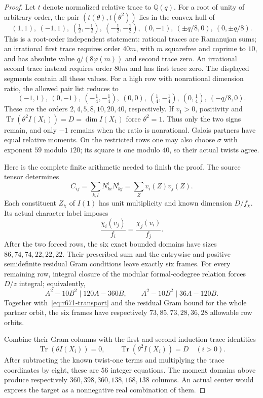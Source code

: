 \begin{proof}
Let $t$ denote normalized relative trace to $\mathbb Q(q)$.
For a root of unity of arbitrary order, the pair
$(t(\theta),t(\theta^2))$ lies in the convex hull of
\[
 (1,1),\ (-1,1),\ (\tfrac12,-\tfrac12),\
 (-\tfrac12,-\tfrac12),\ (0,-1),\
 (\pm q/8,0),\ (0,\pm q/8).
\]
This is a root-order independent statement: rational traces are
Ramanujan sums; an irrational first trace requires order $40m$, with
$m$ squarefree and coprime to $10$, and has absolute value
$q/(8\varphi(m))$ and second trace zero. An irrational second trace
instead requires order $80m$ and has first trace zero. The displayed
segments contain all these values.
For a high row with nonrational dimension ratio, the allowed pair
list reduces to
\[
 (-1,1),\ (0,-1),\ (-\tfrac14,-\tfrac14),\ (0,0),\
 (\tfrac14,-\tfrac14),\ (0,\tfrac14),\ (-q/8,0).
\]
These are the orders $2,4,5,8,10,20,40$, respectively.
If $v_1>0$, positivity and
$\operatorname{Tr}(\theta^2I(X_1))=D=\dim I(X_1)$ force
$\theta^2=1$. Thus only the two signs remain, and only $-1$ remains
when the ratio is nonrational. Galois partners have equal relative
moments. On the restricted rows one may also choose $\sigma$ with
exponent $59$ modulo $120$; its square is one modulo $40$, so their
actual twists agree.

Here is the complete finite arithmetic needed to finish the proof.
The source tensor determines
\[
 C_{ij}=\sum_{k,l}N_{ki}^{l}N_{kj}^{l}=\sum_Zv_i(Z)v_j(Z).
\]
Each constituent $Z_\chi$ of $I(1)$ has unit multiplicity and
known dimension $D/f_\chi$. Its actual character label imposes
\[
 \frac{\chi_i(v_j)}{f_i}=\frac{\chi_j(v_i)}{f_j}.
\]
After the two forced rows, the six exact bounded domains have sizes
$86,74,74,22,22,22$. Their prescribed sum and the entrywise and
positive semidefinite residual Gram conditions leave exactly six
frames. For every remaining row, integral closure of the modular
formal-codegree relation forces $D/z$ integral; equivalently,
\[
 A^2-10B^2\mid120A-360B,\qquad
 A^2-10B^2\mid36A-120B.
\]
Together with~\eqref{eq:r671-transport} and the residual Gram bound
for the whole partner orbit, the six frames have respectively
$73,85,73,28,36,28$ allowable row orbits.

Combine their Gram columns with the first and second induction trace
identities
\[
 \operatorname{Tr}(\theta I(X_i))=0,\qquad
 \operatorname{Tr}(\theta^2I(X_i))=D\quad(i>0).
\]
After subtracting the known twist-one terms and multiplying the
trace coordinates by eight, these are $56$ integer equations.
The moment domains above produce respectively
$360,398,360,138,168,138$ columns. An actual center would express the
target as a nonnegative real combination of them.


\end{proof}
